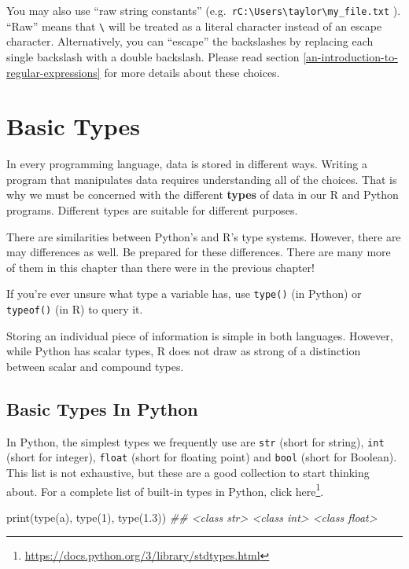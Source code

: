 \documentclass[
  12pt,
  krantz2]{krantz}
\makeatletter
\newenvironment{Shaded}{\begin{snugshade}}{\end{snugshade}}
\newcommand{\BuiltInTok}[1]{#1}
\newcommand{\CommentTok}[1]{\textcolor[rgb]{0.37,0.37,0.37}{\textit{#1}}}
\newcommand{\DecValTok}[1]{\textcolor[rgb]{0.06,0.06,0.06}{#1}}
\newcommand{\FloatTok}[1]{\textcolor[rgb]{0.06,0.06,0.06}{#1}}
\newcommand{\NormalTok}[1]{#1}
\newcommand{\StringTok}[1]{\textcolor[rgb]{0.5,0.5,0.5}{#1}}
\renewcommand{\href}[2]{#2\footnote{\url{#1}}}
\newenvironment{kframe}{%
\medskip{}
\setlength{\fboxsep}{.8em}
 \def\at@end@of@kframe{}%
 \ifinner\ifhmode%
  \def\at@end@of@kframe{\end{minipage}}%
  \begin{minipage}{\columnwidth}%
 \fi\fi%
 \def\FrameCommand##1{\hskip\@totalleftmargin \hskip-\fboxsep
 \colorbox{shadecolor}{##1}\hskip-\fboxsep
     \hskip-\linewidth \hskip-\@totalleftmargin \hskip\columnwidth}%
 \MakeFramed {\advance\hsize-\width
   \@totalleftmargin\z@ \linewidth\hsize
   \@setminipage}}%
 {\par\unskip\endMakeFramed%
 \at@end@of@kframe}
\renewenvironment{Shaded}{\begin{kframe}}{\end{kframe}}
\makeatother
\begin{document}
You may also use ``raw string constants'' (e.g.~\texttt{r\textquotesingle{}C:\textbackslash{}Users\textbackslash{}taylor\textbackslash{}my\_file.txt\textquotesingle{}} ). ``Raw'' means that \texttt{\textbackslash{}} will be treated as a literal character instead of an escape character. Alternatively, you can ``escape'' the backslashes by replacing each single backslash with a double backslash. Please read section \ref{an-introduction-to-regular-expressions} for more details about these choices.

\hypertarget{basic-types}{%
\chapter{Basic Types}\label{basic-types}}

In every programming language, data is stored in different ways. Writing a program that manipulates data requires understanding all of the choices. That is why we must be concerned with the different \textbf{types} of data in our R and Python programs. Different types are suitable for different purposes.

There are similarities between Python's and R's type systems. However, there are may differences as well. Be prepared for these differences. There are many more of them in this chapter than there were in the previous chapter!

If you're ever unsure what type a variable has, use \texttt{type()} (in Python) or \texttt{typeof()} (in R) to query it.

Storing an individual piece of information is simple in both languages. However, while Python has scalar types, R does not draw as strong of a distinction between scalar and compound types.

\hypertarget{basic-types-in-python}{%
\section{Basic Types In Python}\label{basic-types-in-python}}

In Python, the simplest types we frequently use are \texttt{str} (short for string), \texttt{int} (short for integer), \texttt{float} (short for floating point) and \texttt{bool} (short for Boolean). This list is not exhaustive, but these are a good collection to start thinking about. For a complete list of built-in types in Python, click \href{https://docs.python.org/3/library/stdtypes.html}{here}.

\begin{Shaded}
\begin{Highlighting}[]
\BuiltInTok{print}\NormalTok{(}\BuiltInTok{type}\NormalTok{(}\StringTok{\textquotesingle{}a\textquotesingle{}}\NormalTok{), }\BuiltInTok{type}\NormalTok{(}\DecValTok{1}\NormalTok{), }\BuiltInTok{type}\NormalTok{(}\FloatTok{1.3}\NormalTok{))}
\CommentTok{\#\# \textless{}class \textquotesingle{}str\textquotesingle{}\textgreater{} \textless{}class \textquotesingle{}int\textquotesingle{}\textgreater{} \textless{}class \textquotesingle{}float\textquotesingle{}\textgreater{}}
\end{Highlighting}
\end{Shaded}
\end{document}
